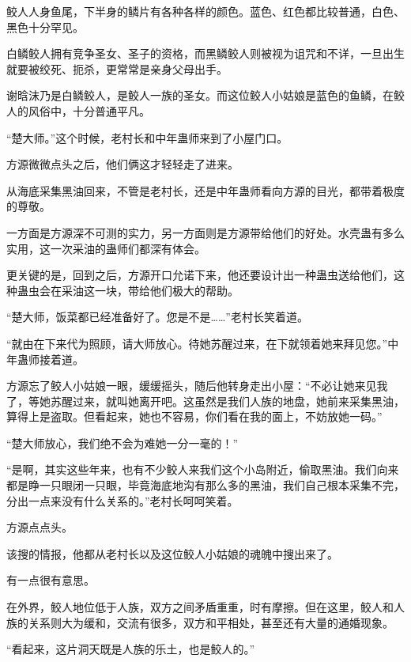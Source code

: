 \begin{this_body}
鲛人人身鱼尾，下半身的鳞片有各种各样的颜色。蓝色、红色都比较普通，白色、黑色十分罕见。

白鳞鲛人拥有竞争圣女、圣子的资格，而黑鳞鲛人则被视为诅咒和不详，一旦出生就要被绞死、扼杀，更常常是亲身父母出手。

谢晗沫乃是白鳞鲛人，是鲛人一族的圣女。而这位鲛人小姑娘是蓝色的鱼鳞，在鲛人的风俗中，十分普通平凡。

“楚大师。”这个时候，老村长和中年蛊师来到了小屋门口。

方源微微点头之后，他们俩这才轻轻走了进来。

从海底采集黑油回来，不管是老村长，还是中年蛊师看向方源的目光，都带着极度的尊敬。

一方面是方源深不可测的实力，另一方面则是方源带给他们的好处。水壳蛊有多么实用，这一次采油的蛊师们都深有体会。

更关键的是，回到之后，方源开口允诺下来，他还要设计出一种蛊虫送给他们，这种蛊虫会在采油这一块，带给他们极大的帮助。

“楚大师，饭菜都已经准备好了。您是不是……”老村长笑着道。

“就由在下来代为照顾，请大师放心。待她苏醒过来，在下就领着她来拜见您。”中年蛊师接着道。

方源忘了鲛人小姑娘一眼，缓缓摇头，随后他转身走出小屋：“不必让她来见我了，等她苏醒过来，就叫她离开吧。这虽然是我们人族的地盘，她前来采集黑油，算得上是盗取。但看起来，她也不容易，你们看在我的面上，不妨放她一码。”

“楚大师放心，我们绝不会为难她一分一毫的！”

“是啊，其实这些年来，也有不少鲛人来我们这个小岛附近，偷取黑油。我们向来都是睁一只眼闭一只眼，毕竟海底地沟有那么多的黑油，我们自己根本采集不完，分出一点来没有什么关系的。”老村长呵呵笑着。

方源点点头。

该搜的情报，他都从老村长以及这位鲛人小姑娘的魂魄中搜出来了。

有一点很有意思。

在外界，鲛人地位低于人族，双方之间矛盾重重，时有摩擦。但在这里，鲛人和人族的关系则大为缓和，交流有很多，双方和平相处，甚至还有大量的通婚现象。

“看起来，这片洞天既是人族的乐土，也是鲛人的。”

\end{this_body}

